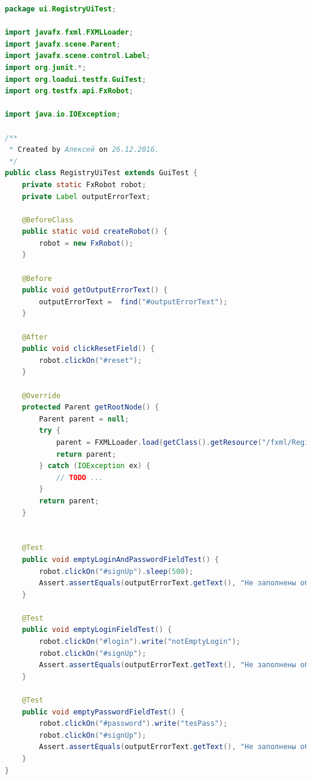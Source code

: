 \documentclass[a4paper,12pt]{article}
\begin{document}
\begin{lstlisting}[language=java, caption=код модуля RegistryUiTest.java]
package ui.RegistryUiTest;

import javafx.fxml.FXMLLoader;
import javafx.scene.Parent;
import javafx.scene.control.Label;
import org.junit.*;
import org.loadui.testfx.GuiTest;
import org.testfx.api.FxRobot;

import java.io.IOException;

/**
 * Created by Алексей on 26.12.2016.
 */
public class RegistryUiTest extends GuiTest {
    private static FxRobot robot;
    private Label outputErrorText;

    @BeforeClass
    public static void createRobot() {
        robot = new FxRobot();
    }

    @Before
    public void getOutputErrorText() {
        outputErrorText =  find("#outputErrorText");
    }

    @After
    public void clickResetField() {
        robot.clickOn("#reset");
    }

    @Override
    protected Parent getRootNode() {
        Parent parent = null;
        try {
            parent = FXMLLoader.load(getClass().getResource("/fxml/Registry.fxml"));
            return parent;
        } catch (IOException ex) {
            // TODO ...
        }
        return parent;
    }


    @Test
    public void emptyLoginAndPasswordFieldTest() {
        robot.clickOn("#signUp").sleep(500);
        Assert.assertEquals(outputErrorText.getText(), "Не заполнены обязательные поля: Логин; Пароль; ");
    }

    @Test
    public void emptyLoginFieldTest() {
        robot.clickOn("#login").write("notEmptyLogin");
        robot.clickOn("#signUp");
        Assert.assertEquals(outputErrorText.getText(), "Не заполнены обязательные поля: Пароль; ");
    }

    @Test
    public void emptyPasswordFieldTest() {
        robot.clickOn("#password").write("tesPass");
        robot.clickOn("#signUp");
        Assert.assertEquals(outputErrorText.getText(), "Не заполнены обязательные поля: Логин; ");
    }
}
\end{lstlisting}
\end{document}
